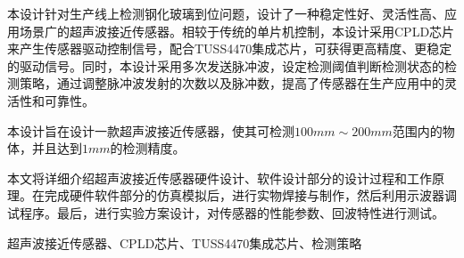 \begin{ZhAbstract}
    本设计针对生产线上检测钢化玻璃到位问题，设计了一种稳定性好、灵活性高、应用场景广的超声波接近传感器。相较于传统的单片机控制，本设计采用CPLD芯片来产生传感器驱动控制信号，配合TUSS4470集成芯片，可获得更高精度、更稳定的驱动信号。同时，本设计采用多次发送脉冲波，设定检测阈值判断检测状态的检测策略，通过调整脉冲波发射的次数以及脉冲数，提高了传感器在生产应用中的灵活性和可靠性。\par
    本设计旨在设计一款超声波接近传感器，使其可检测$100mm\sim200mm$范围内的物体，并且达到$1mm$的检测精度。
    
    本文将详细介绍超声波接近传感器硬件设计、软件设计部分的设计过程和工作原理。在完成硬件软件部分的仿真模拟后，进行实物焊接与制作，然后利用示波器调试程序。最后，进行实验方案设计，对传感器的性能参数、回波特性进行测试。    
    
    \ChineseKeyWord 超声波接近传感器、CPLD芯片、TUSS4470集成芯片、检测策略
    
\end{ZhAbstract}